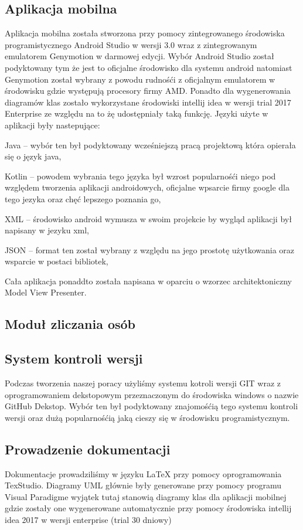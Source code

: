 \subsection{Aplikacja mobilna}
Aplikacja mobilna została stworzona przy pomocy zintegrowanego środowiska programistycznego Android Studio w wersji 3.0 wraz z zintegrowanym emulatorem Genymotion w darmowej edycji. Wybór Android Studio został podyktowany tym że jest to oficjalne środowisko dla systemu android natomiast Genymotion został wybrany z powodu rudnośći z oficjalnym emulatorem w środowisku gdzie występują procesory firmy AMD.  Ponadto dla wygenerowania diagramów klas zostało wykorzystane środowiski intellij idea w wersji trial 2017 Enterprise ze względu na to żę udostępniały taką funkcję. Języki użyte w aplikacji były nastepujące:
\begin{itemize*}
	\item Java -- wybór ten był podyktowany wcześniejszą pracą projektową która opierała się o język java,
	\item Kotlin -- powodem wybrania tego języka był wzrost popularnośći niego pod względem tworzenia aplikacji androidowych, oficjalne wpsarcie firmy google dla tego jezyka oraz chęć lepszego poznania go,
	\item XML -- środowisko android wymusza w swoim projekcie by wygląd aplikacji był napisany w jezyku xml,
	\item JSON -- format ten  został wybrany z względu na jego prostotę użytkowania oraz wsparcie w postaci bibliotek,
\end{itemize*}
Cała aplikacja ponaddto została napisana w oparciu o wzorzec architektoniczny Model View Presenter. 

\newpage
\subsection{Moduł zliczania osób}

\newpage
\subsection{System kontroli wersji}
Podczas tworzenia naszej poracy użyliśmy systemu kotroli wersji GIT wraz z  oprogramowaniem dekstopowym przeznaczonym do środowiska windows o nazwie GitHub Dekstop. Wybór ten był podyktowany znajomośćią tego systemu kontroli wersji oraz dużą popularnośćią jaką cieszy się w środowisku programistycznym.

\newpage
\subsection{Prowadzenie dokumentacji}
 Dokumentacje prowadziliśmy w języku LaTeX przy pomocy oprogramowania TexStudio. Diagramy UML głównie były generowane przy pomocy programu Visual Paradigme wyjątek tutaj stanowią diagramy klas dla aplikacji mobilnej gdzie zostały one wygenerowane automatycznie przy pomocy środowiska intellij idea 2017 w wersji enterprise (trial 30 dniowy)

